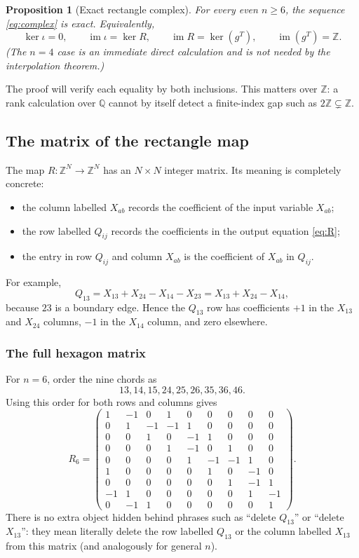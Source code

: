 \documentclass[11pt]{article}
\newtheorem{proposition}[theorem]{Proposition}
\theoremstyle{definition}
\newcommand{\Z}{\mathbb Z}
\newcommand{\im}{\operatorname{im}}
\begin{document}
\begin{proposition}[Exact rectangle complex]
For every even \(n\ge6\), the sequence \eqref{eq:complex} is exact.  Equivalently,
\[
 \ker\iota=0,
 \qquad
 \im\iota=\ker R,
 \qquad
 \im R=\ker(g^T),
 \qquad
 \im(g^T)=\Z.
\]
(The \(n=4\) case is an immediate direct calculation and is not needed by the interpolation theorem.)
\end{proposition}

The proof will verify each equality by both inclusions.  This matters over
$\Z$: a rank calculation over $\mathbb Q$ cannot by itself detect a finite-index
gap such as $2\Z\subsetneq\Z$.

\subsection{The matrix of the rectangle map}

The map $R:\Z^N\to\Z^N$ has an $N\times N$ integer matrix.  Its meaning is
completely concrete:
\begin{itemize}[leftmargin=2em]
\item the column labelled $X_{ab}$ records the coefficient of the input
      variable $X_{ab}$;
\item the row labelled $Q_{ij}$ records the coefficients in the output
      equation \eqref{eq:R};
\item the entry in row $Q_{ij}$ and column $X_{ab}$ is the coefficient of
      $X_{ab}$ in $Q_{ij}$.
\end{itemize}
For example,
\[
 Q_{13}=X_{13}+X_{24}-X_{14}-X_{23}
       =X_{13}+X_{24}-X_{14},
\]
because $23$ is a boundary edge.  Hence the $Q_{13}$ row has coefficients
$+1$ in the $X_{13}$ and $X_{24}$ columns, $-1$ in the $X_{14}$ column, and
zero elsewhere.

\subsubsection{The full hexagon matrix}

For $n=6$, order the nine chords as
\[
13,14,15,24,25,26,35,36,46.
\]
Using this order for both rows and columns gives
\[
R_6=
\begin{pmatrix}
 1&-1& 0& 1& 0& 0& 0& 0& 0\\
 0& 1&-1&-1& 1& 0& 0& 0& 0\\
 0& 0& 1& 0&-1& 1& 0& 0& 0\\
 0& 0& 0& 1&-1& 0& 1& 0& 0\\
 0& 0& 0& 0& 1&-1&-1& 1& 0\\
 1& 0& 0& 0& 0& 1& 0&-1& 0\\
 0& 0& 0& 0& 0& 0& 1&-1& 1\\
-1& 1& 0& 0& 0& 0& 0& 1&-1\\
 0&-1& 1& 0& 0& 0& 0& 0& 1
\end{pmatrix}.
\]
There is no extra object hidden behind phrases such as ``delete $Q_{13}$''
or ``delete $X_{13}$'': they mean literally delete the row labelled $Q_{13}$
or the column labelled $X_{13}$ from this matrix (and analogously for general
$n$).
\end{document}
